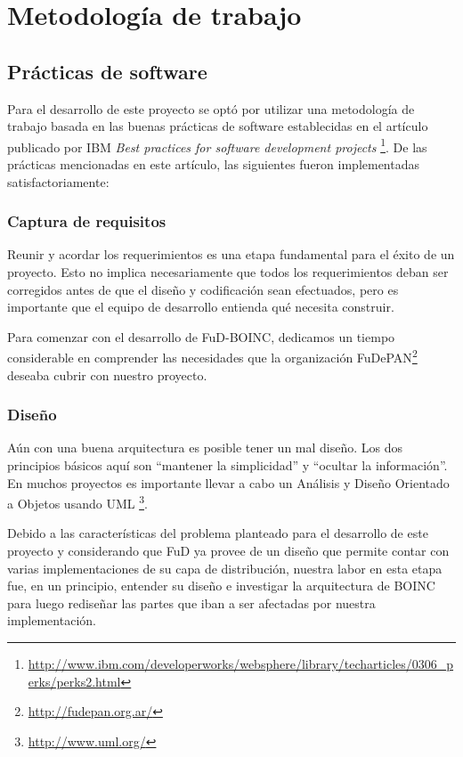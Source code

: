\chapter{Metodología de trabajo}
\label{chapter:metodologia}

\section{Prácticas de software}

Para el desarrollo de este proyecto se optó por utilizar una metodología de trabajo basada en las buenas prácticas de software establecidas en el artículo publicado por IBM \textit{Best practices for software development projects} \footnote{\url{http://www.ibm.com/developerworks/websphere/library/techarticles/0306_perks/perks2.html}}. De las prácticas mencionadas en este artículo, las siguientes fueron implementadas satisfactoriamente:

\subsection{Captura de requisitos}

Reunir y acordar los requerimientos es una etapa fundamental para el éxito de un proyecto. Esto no implica necesariamente que todos los requerimientos deban ser corregidos antes de que el diseño y codificación sean efectuados, pero es importante que el equipo de desarrollo entienda qué necesita construir.

Para comenzar con el desarrollo de FuD-BOINC, dedicamos un tiempo considerable en comprender las necesidades que la organización FuDePAN\footnote{\url{http://fudepan.org.ar/}} deseaba cubrir con nuestro proyecto. 

\subsection{Diseño}

Aún con una buena arquitectura es posible tener un mal diseño. Los dos principios básicos aquí son ``mantener la simplicidad'' y ``ocultar la información''. En muchos proyectos es importante llevar a cabo un Análisis y Diseño Orientado a Objetos usando UML \footnote{\url{http://www.uml.org/}}.

Debido a las características del problema planteado para el desarrollo de este proyecto y considerando que FuD ya provee de un diseño que permite contar con varias implementaciones de su capa de distribución, nuestra labor en esta etapa fue, en un principio, entender su diseño e investigar la arquitectura de BOINC para luego rediseñar las partes que iban a ser afectadas por nuestra implementación.

